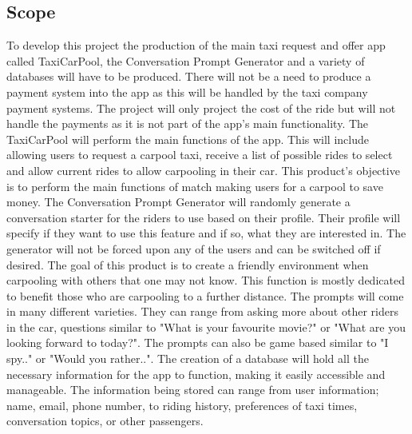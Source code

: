 \documentclass[]{article}
\begin{document}
\subsection{Scope}
\label{sub:scope}
To develop this project the production of the main taxi request and offer app called TaxiCarPool, the Conversation Prompt Generator and a variety of databases will have to be produced. There will not be a need to produce a payment system into the app as this will be handled by the taxi company payment systems. The project will only project the cost of the ride but will not handle the payments as it is not part of the app’s main functionality.
\newline \newline
The TaxiCarPool will perform the main functions of the app. This will include allowing users to request a carpool taxi, receive a list of possible rides to select and allow current rides to allow carpooling in their car. This product’s objective is to perform the main functions of match making users for a carpool to save money. 
\newline \newline
The Conversation Prompt Generator will randomly generate a conversation starter for the riders to use based on their profile. Their profile will specify if they want to use this feature and if so, what they are interested in. The generator will not be forced upon any of the users and can be switched off if desired. The goal of this product is to create a friendly environment when carpooling with others that one may not know. This function is mostly dedicated to benefit those who are carpooling to a further distance. The prompts will come in many different varieties. They can range from asking more about other riders in the car, questions similar to "What is your favourite movie?" or "What are you looking forward to today?". The prompts can also be game based similar to "I spy.." or "Would you rather..".
\newline \newline
The creation of a database will hold all the necessary information for the app to function, making it easily accessible and manageable. The information being stored can range from user information; name, email, phone number, to riding history, preferences of taxi times, conversation topics, or other passengers. 
\end{document}

